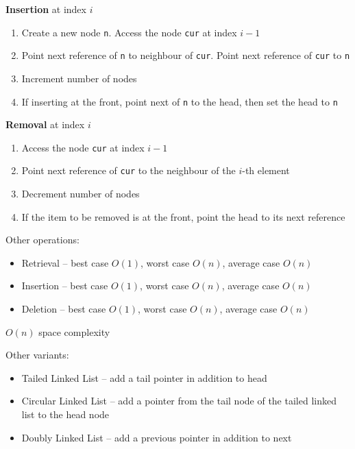 \documentclass[10pt,landscape,a4paper]{article}
\begin{document}
\begin{multicols}{4}
\textbf{Insertion} at index $i$
\begin{enumerate}
	\item Create a new node \texttt{n}. Access the node \texttt{cur}  at index $i-1$
	\item Point next reference of \texttt{n} to neighbour of \texttt{cur}. Point next reference of \texttt{cur} to \texttt{n}
	\item Increment number of nodes
	\item If inserting at the front, point next of \texttt{n} to the head, then set the head to \texttt{n}
\end{enumerate}
\textbf{Removal} at index $i$
\begin{enumerate}
	\item Access the node \texttt{cur} at index $i-1$
	\item Point next reference of \texttt{cur} to the neighbour of the  $i$-th element
	\item Decrement number of nodes
	\item If the item to be removed is at the front, point the head to its next reference
\end{enumerate}
Other operations:
\begin{itemize}
	\item Retrieval -- best case $O(1)$, worst case  $O(n)$, average case  $O(n)$
	\item Insertion -- best case  $O(1)$, worst case  $O(n)$, average case  $O(n)$
	\item Deletion -- best case  $O(1)$, worst case  $O(n)$, average case  $O(n)$
\end{itemize}
$O(n)$ space complexity

Other variants:
\begin{itemize}
	\item Tailed Linked List -- add a tail pointer in addition to head
	\item Circular Linked List -- add a pointer from the tail node of the tailed linked list to the head node
	\item Doubly Linked List -- add a previous pointer in addition to next
\end{itemize}

\end{multicols}
\end{document}
